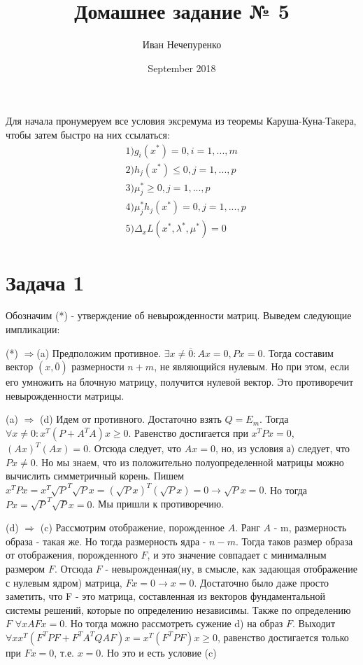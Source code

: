 \documentclass{article}
\title{Домашнее задание № 5}
\author{Иван Нечепуренко }
\date{September 2018}
\begin{document}
\maketitle

Для начала пронумеруем все условия эксремума из теоремы Каруша-Куна-Такера, чтобы затем быстро на них ссылаться:
\begin{align*}
&1) g_i(x^ *) = 0, i = 1, . . . , m \\
&2) h_j(x^*) \leq 0, j = 1, . . . , p \\
&3) \mu^*_j \geq 0, j = 1, . . . , p \\
&4) \mu^*_j h_j(x^*) = 0, j = 1, . . . , p \\
&5) \Delta_x L(x^*, \lambda^*, \mu^*) = 0 
\end{align*}

\section{Задача 1}
Обозначим (*) - утверждение об невырожденности матриц. Выведем следующие импликации:

(*) $\Longrightarrow$(a) Предположим противное. $\exists x \neq \overline{0}: Ax = 0, Px = 0$. Тогда составим вектор $(x, \overline{0})$ размерности $n + m$, не являющийся нулевым. Но при этом, если его умножить на блочную матрицу, получится нулевой вектор. Это противоречит невырожденности матрицы.

(a)  $\Longrightarrow$ (d) Идем от противного. Достаточно взять $Q = E_m$. Тогда $\forall x \neq 0: x^T(P + A^TA)x \geq 0$. Равенство достигается при $x^TPx = 0$, $(Ax)^T(Ax) = 0$. Отсюда следует, что $Ax = 0$, но, из условия а) следует, что $Px \neq 0$. Но мы знаем, что из положительно полуопределенной матрицы можно вычислить симметричный корень. Пишем $x^TPx = x^T \sqrt{P}^T \sqrt{P} x = (\sqrt{P} x)^T(\sqrt{P} x) = 0 \longrightarrow \sqrt{P} x = 0$. Но тогда $Px = \sqrt{P}^T\sqrt{P} x = 0$. Мы пришли к противоречию.

(d)  $\Longrightarrow$ (c) Рассмотрим отображение, порожденное $A$. Ранг $A$ - m, размерность образа - такая же. Но тогда размерность ядра - $ n - m$. Тогда таков размер образа от отображения, порожденного $F$, и это значение совпадает с минималным размером $F$. Отсюда $F$ - невырожденная(ну, в смысле, как задающая отображение с нулевым ядром) матрица, $Fx = 0 \longrightarrow x = 0$. Достаточно было даже просто заметить, что F - это матрица, составленная из векторов фундаментальной системы решений, которые по определению независимы. Также по определению $F$ $\forall x AFx = 0$. Но тогда можно рассмотреть сужение d) на образ $F$. Выходит $ \forall x x^T(F^TPF + F^TA^TQAF)x = x^T(F^TPF)x  \geq 0$, равенство достигается только при $ Fx = 0$, т.е. $x = 0$. Но это и есть условие (c)
\end{document}
